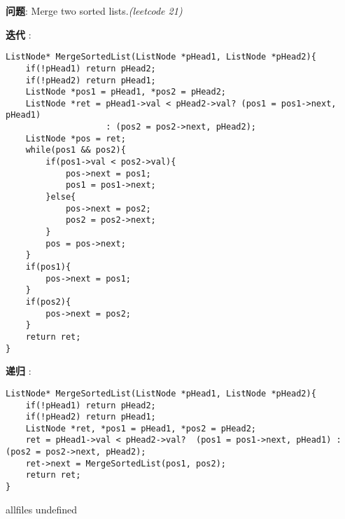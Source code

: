 \documentclass{article}
\begin{document}
\begin{CJK}{UTF8}{gbsn}     %

\else
    
\begin{description}
    \item{\textbf{问题}}: Merge two sorted lists.\textit{(leetcode 21)}
    \item{\textbf{迭代}} : 
    \\
    \begin{lstlisting}
ListNode* MergeSortedList(ListNode *pHead1, ListNode *pHead2){
	if(!pHead1)	return pHead2;
	if(!pHead2)	return pHead1;
	ListNode *pos1 = pHead1, *pos2 = pHead2;
	ListNode *ret = pHead1->val < pHead2->val? (pos1 = pos1->next, pHead1) 
					: (pos2 = pos2->next, pHead2);
	ListNode *pos = ret;
	while(pos1 && pos2){
		if(pos1->val < pos2->val){
			pos->next = pos1;
			pos1 = pos1->next;
		}else{
			pos->next = pos2;
			pos2 = pos2->next;
		}
		pos = pos->next;
	}
	if(pos1){
		pos->next = pos1;
	}
	if(pos2){
		pos->next = pos2;
	}
	return ret;
}
    \end{lstlisting}
    \item{\textbf{递归}} : 
	\begin{lstlisting}
ListNode* MergeSortedList(ListNode *pHead1, ListNode *pHead2){
	if(!pHead1)	return pHead2;
	if(!pHead2)	return pHead1;
	ListNode *ret, *pos1 = pHead1, *pos2 = pHead2;
	ret = pHead1->val < pHead2->val?  (pos1 = pos1->next, pHead1) : (pos2 = pos2->next, pHead2);
	ret->next = MergeSortedList(pos1, pos2);
	return ret; 
}
	\end{lstlisting}
\end{description}

\fi

\ifx allfiles undefined
\end{CJK}
\end{document}
